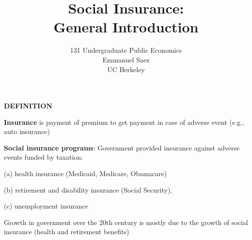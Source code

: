 \documentclass[landscape]{slides}
\author{131 Undergraduate Public Economics \\ Emmanuel Saez \\ UC Berkeley}
\date{}
\title{Social Insurance: \\ General Introduction} \onlyslides{1-300}
\begin{document}
\begin{slide}
\maketitle
\end{slide}

%
%
%
%
%
%
%


%
%
%


%

\begin{slide}
\begin{center}
{\bf DEFINITION}
\end{center}
\textbf{Insurance} is payment of premium to get payment in case of adverse event
(e.g., auto insurance)

{\bf Social insurance programs}:
Government provided insurance against adverse events funded by taxation:

(a) health insurance (Medicaid, Medicare, Obamacare)

(b) retirement and disability insurance (Social Security),

(c) unemployment insurance

Growth in government over the 20th century is mostly due to the growth of social insurance (health and retirement benefits)



%
\end{slide}
\end{document}
